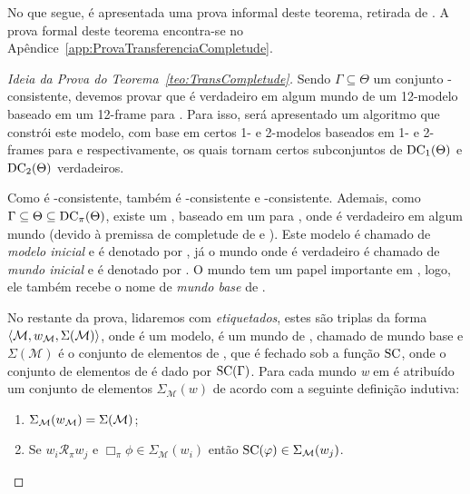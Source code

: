             No que segue, é apresentada uma prova informal deste teorema, retirada de \cite[p.~178]{fine1996transfer}.
            A prova formal deste teorema encontra-se no Apêndice~\ref{app:ProvaTransferenciaCompletude}.

            \begin{proof}[Ideia da Prova do Teorema~\ref{teo:TransCompletude}]
                \label{proof:ProvaTransferencia}
                Sendo \(\Gamma \subseteq \Theta\) um conjunto -consistente, devemos provar que \GAMMA é verdadeiro em algum mundo de um 12-modelo baseado
                em um 12-frame para . Para isso, será apresentado um algoritmo que constrói este modelo, com base em certos
                1- e 2-modelos baseados em 1- e 2-frames para  e  respectivamente, os quais tornam certos subconjuntos de
                \(\operatorname{DC}_1(\Theta)\) e \(\operatorname{DC}_2(\Theta)\) verdadeiros.

                Como \GAMMA é -consistente, \GAMMA também é -consistente e -consistente. Ademais, como
                \(\Gamma \subseteq \Theta \subseteq \operatorname{DC}_{\pi}(\Theta)\), existe um \PImodelo, baseado em um \PIframe para , onde \GAMMA é verdadeiro em
                algum mundo (devido à premissa de completude de  e ). Este modelo é chamado de \textit{modelo inicial} e é denotado por \Modeloinicial,
                já o mundo onde \GAMMA é verdadeiro é chamado de \textit{mundo inicial} e é denotado por \Mundoinicial. O mundo \Mundoinicial tem um papel importante em \Modeloinicial, logo, ele também
                recebe o nome de \textit{mundo base} de \Modeloinicial.

                No restante da prova, lidaremos com \textit{\PImodelos etiquetados}, estes são triplas da forma \(\langle \mathcal{M}, w_{\mathcal{M}}, \Sigma(\mathcal{M}) \rangle\),
                onde  é um modelo, \Mundobase é um mundo de , chamado de mundo base e \(\Sigma(\mathcal{M})\) é o conjunto de elementos de , que é fechado sob
                a função \(\operatorname{SC}\), onde o conjunto de elementos de \Modeloinicial é dado por \(\operatorname{SC}(\Gamma)\).
                Para cada mundo \textit{w} em  é atribuído um conjunto de elementos \(\Sigma_{\mathcal{M}}(w)\) de acordo com a seguinte definição indutiva:
                \begin{enumerate}
                    \item \(\Sigma_{\mathcal{M}}(w_{\mathcal{M}}) = \Sigma(\mathcal{M})\);
                    \item Se \(w_i \mathcal{R}_{\pi} w_j\) e \(\Box_{\pi}\phi \in \Sigma_{\mathcal{M}}(w_i)\) então \(\operatorname{SC}(\varphi) \in \Sigma_{\mathcal{M}}(w_j)\).
                \end{enumerate}


\end{proof}
